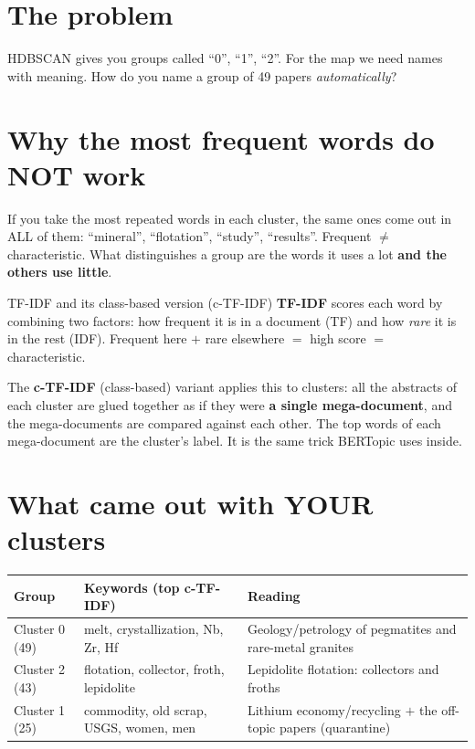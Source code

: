 \documentclass[11pt,a4paper]{article}
\begin{document}

\section{The problem}

HDBSCAN gives you groups called ``0'', ``1'', ``2''. For the map we need names with meaning.
How do you name a group of 49 papers \emph{automatically}?

\section{Why the most frequent words do NOT work}

If you take the most repeated words in each cluster, the same ones come out in ALL of them:
``mineral'', ``flotation'', ``study'', ``results''. Frequent $\neq$ characteristic. What
distinguishes a group are the words it uses a lot \textbf{and the others use little}.

\begin{concepto}{TF-IDF and its class-based version (c-TF-IDF)}
\textbf{TF-IDF} scores each word by combining two factors: how frequent it is in a document
(TF) and how \emph{rare} it is in the rest (IDF). Frequent here $+$ rare elsewhere $=$ high
score $=$ characteristic.

The \textbf{c-TF-IDF} (class-based) variant applies this to clusters: all the abstracts of
each cluster are glued together as if they were \textbf{a single mega-document}, and the
mega-documents are compared against each other. The top words of each mega-document are the
cluster's label. It is the same trick BERTopic uses inside.
\end{concepto}

\section{What came out with YOUR clusters}

\begin{center}
\begin{tabular}{lp{5.2cm}p{5.2cm}}
\textbf{Group} & \textbf{Keywords (top c-TF-IDF)} & \textbf{Reading} \\
\hline
Cluster 0 (49) & melt, crystallization, Nb, Zr, Hf & Geology/petrology of pegmatites and
rare-metal granites \\
Cluster 2 (43) & flotation, collector, froth, lepidolite & Lepidolite flotation:
collectors and froths \\
Cluster 1 (25) & commodity, old scrap, USGS, women, men & Lithium economy/recycling $+$ the
off-topic papers (quarantine) \\
\end{tabular}
\end{center}
\end{document}
